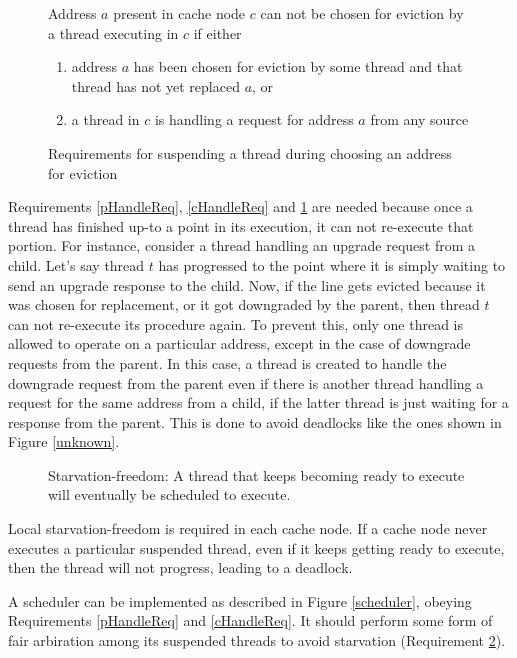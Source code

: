 \begin{figure}\small
\begin{requirement}
Address $a$ present in cache node $c$ can not be chosen for eviction by a thread
executing in $c$ if either
\begin{enumerate}
\item address $a$ has been chosen for eviction by some thread and that thread
has not yet replaced $a$, or
\item a thread in $c$ is handling a request for address
$a$ from any source
\end{enumerate}\label{evict}
\caption{Requirements for suspending a thread during choosing an address for eviction}
\end{requirement}
\end{figure}

Requirements \ref{pHandleReq}, \ref{cHandleReq} and \ref{evict} are needed
because once a thread has finished up-to a point in its execution, it can not
re-execute that portion. For instance, consider a thread handling an upgrade
request from a child. Let's say thread $t$ has progressed to the point where it
is simply waiting to send an upgrade response to the child. Now, if the line
gets evicted because it was chosen for replacement, or it got downgraded by the
parent, then thread $t$ can not re-execute its procedure again. To prevent this,
only one thread is allowed to operate on a particular address, except in the
case of downgrade requests from the parent. In this case, a thread is created to
handle the downgrade request from the parent even if there is another thread
handling a request for the same address from a child, if the latter thread is
just waiting for a response from the parent. This is done to avoid deadlocks
like the ones shown in Figure \ref{unknown}.

\begin{figure}\small
\begin{requirement}
Starvation-freedom: A thread that keeps becoming ready to execute will
eventually be scheduled to execute.\label{starvation}
\end{requirement}
\end{figure}

Local starvation-freedom is required in each cache node. If a cache node never
executes a particular suspended thread, even if it keeps getting ready to
execute, then the thread will not progress, leading to a deadlock.

A scheduler can be implemented as described in Figure \ref{scheduler}, obeying
Requirements \ref{pHandleReq} and \ref{cHandleReq}. It should perform some form of
fair arbiration among its suspended threads to avoid starvation (Requirement
\ref{starvation}).

